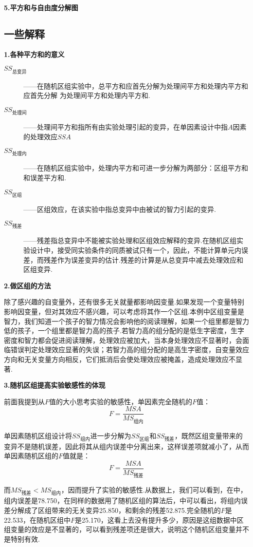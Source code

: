 \textbf{5.平方和与自由度分解图}


\subsection{一些解释}
\textbf{1.各种平方和的意义}

\begin{description}
\item[$SS_{\text{总变异}}$]——在随机区组实验中，总平方和应首先分解为处理间平方和处理内平方和应首先分解 为处理间平方和处理内平方和.
\item[$SS_{\text{处理间}}$]——处理间平方和指所有由实验处理引起的变异，在单因素设计中指$A$因素的处理效应$SSA$
\item[$SS_{\text{处理内}}$]——在随机区组实验中，处理内平方和可进一步分解为两部分：区组平方和和误差平方和.
\item[$SS_{\text{区组}}$]——区组效应，在该实验中指总变异中由被试的智力引起的变异.
\item[$SS_{\text{残差}}$]——残差指总变异中不能被实验处理和区组效应解释的变异.在随机区组实验设计中，接受同实验条件的同质被试只有一个，因此，不能计算单元内误差，而残差作为误差变异的估计.残差的计算是从总变异中减去处理效应和区组变异.
\end{description}

\textbf{2.做区组的方法}

除了感兴趣的自变量外，还有很多无关就量都影响因变量.如果发现一个变量特别影响因变量，但对其效应不感兴趣，可以考虑将其作一个区组.本例中区组变量是智力，我们知道一个孩子的智力情况会影响他的阅读理解，如果一个组里都是智力低的孩子，一个组里都是智力高的孩子.若智力高的组分配的是低生字密度，生字密度和智力都会促进阅读理解，处理效应被加大，当本身处理效应不显著时，会面临错误判定处理效应显著的失误；若智力高的组分配的是高生字密度，自变量效应方向和无关变量方向相反，它们抵消后会使处理效应被掩盖，造成处理效应不显著.

\textbf{3.随机区组提高实验敏感性的体现}

前面我提到从$F$值的大小思考实验的敏感性，单因素完全随机的$F$值：
\[ F=\frac{MSA}{MS_{\text{组内}}} \]

单因素随机区组设计将$SS_{组内}$进一步分解为$SS_{\text{区组}}$和$SS_{\text{残差}}$，既然区组变量带来的变异不是随机误差，因此将其从组内误差中分离出来，这样误差项就减小了，从而单因素随机区组的$F$值就是：
\[ F = \frac{MSA}{MS_{\text{残差}}} \]

而$MS_{\text{残差}} < MS_{\text{组内}}$，因而提升了实验的敏感性.从数据上，我们可以看到，在中，组内误差是78.750，在同样的数据用了随机区组的算法后，中可以看出，将组内误差分解成了区组带来的无关变异25.850，和剩余的残差52.875.完全随机的$F$是22.533，在随机区组中$F$是25.170，这看上去没有提升多少，原因是这组数据中区组变量的效应是不显著的，可以看到残差项还是很大，说明这个随机区组变量并不是特别有效.

